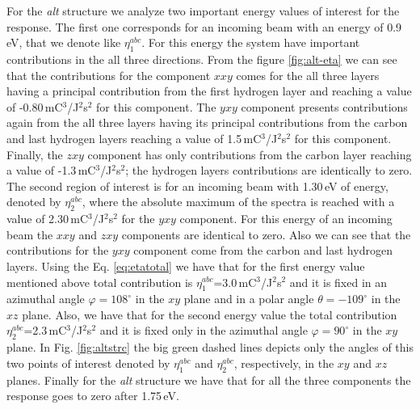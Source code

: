 \documentclass[pss]{wiley2sp} %
\begin{document}
For the \emph{alt} structure we analyze two important energy values of interest for the response. The first one corresponds for an incoming beam with an energy of 0.9\,eV, that we denote like $\eta^{abc}_{1}$. For this energy the system have important contributions in the all three directions. From the figure \ref{fig:alt-eta} we can see that the contributions for the component $xxy$ comes for the all three layers having a principal contribution from the first hydrogen layer and reaching a value of -0.80\,mC$^{3}$/J$^{2}$s$^{2}$ for this component. The $yxy$ component presents contributions again from the all three layers having its principal contributions from the carbon and last hydrogen layers reaching a value of 1.5\,mC$^{3}$/J$^{2}$s$^{2}$ for this component. Finally, the $zxy$ component has only contributions from the carbon layer reaching a value of -1.3\,mC$^{3}$/J$^{2}$s$^{2}$; the hydrogen layers contributions are identically to zero. The second region of interest is for an incoming beam with 1.30\,eV of energy, denoted by $\eta^{abc}_{2}$, where the absolute maximum of the spectra is reached with a value of 2.30\,mC$^{3}$/J$^{2}$s$^{2}$ for the $yxy$ component. For this energy of an incoming beam the $xxy$ and $zxy$ components are identical to zero. Also we can see that the contributions for the $yxy$ component come from the carbon and last hydrogen layers. Using the Eq. \eqref{eq:etatotal} we have that for the first energy value mentioned above total contribution is $\eta^{abc}_{1}$=3.0\,mC$^{3}$/J$^{2}$s$^{2}$ and it is fixed in an azimuthal angle $\varphi=108^{\circ}$ in the $xy$ plane and in a polar angle $\theta=-109^{\circ}$ in the $xz$ plane. Also, we have that for the second energy value the total contribution $\eta^{abc}_{2}$=2.3\,mC$^{3}$/J$^{2}$s$^{2}$ and it is fixed only in the azimuthal angle $\varphi=90^{\circ}$ in the $xy$ plane. In Fig. \ref{fig:altstrc} the big green dashed lines depicts only the angles of this two points of interest denoted by $\eta^{abc}_{1}$ and $\eta^{abc}_{2}$, respectively, in the $xy$ and $xz$ planes. Finally for the \emph{alt} structure  we have that for all the three components the response goes to zero after 1.75\,eV. 
\end{document}
